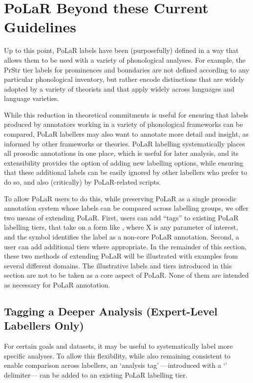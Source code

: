 \chapter{PoLaR Beyond these Current Guidelines}\label{ch:beyond}
Up to this point, PoLaR labels have been (purposefully) defined in a way that allows them to be used with a variety of phonological analyses. For example, the PrStr tier labels for prominences and boundaries  are not defined according to any particular phonological inventory, but rather encode distinctions that are widely adopted by a variety of theorists and that apply widely across languages and language varieties.

While this reduction in theoretical commitments is useful for ensuring that labels produced by annotators working in a variety of phonological frameworks can be compared, PoLaR labellers may also want to annotate more detail and insight, as informed by other frameworks or theories. PoLaR labelling systematically places all prosodic annotations in one place, which is useful for later analysis, and its extensibility provides the option of adding new labelling options, while ensuring that these additional labels can be easily ignored by other labellers who prefer to do so, and also (critically) by PoLaR-related scripts.

To allow PoLaR users to do this, while preserving PoLaR as a single prosodic annotation system whose labels can be compared across labelling groups, we offer two means of extending PoLaR. First, users can add “tags” to existing PoLaR labelling tiers, that take on a form like , where X is any parameter of interest, and the \textlabel{\#} symbol identifies the label as a non-core PoLaR annotation. Second, a user can add additional tiers where appropriate. In the remainder of this section, these two methods of extending PoLaR will be illustrated with examples from several different domains. The illustrative labels and tiers introduced in this section are not to be taken as a core aspect of PoLaR. None of them are intended as necessary for PoLaR annotation.

\section{Tagging a Deeper Analysis (Expert-Level Labellers Only)}\label{sec:tagging-a-deeper-analysis-expert-level-labellers-only}

For certain goals and datasets, it may be useful to systematically label more specific analyses. To allow this flexibility, while also remaining consistent to enable comparison across labellers, an ‘analysis tag’ —introduced with a ‘\textlabel{\#}’ delimiter— can be added to an existing PoLaR labelling tier.

